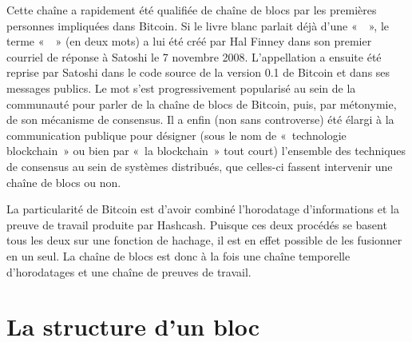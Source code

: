 Cette chaîne a rapidement été qualifiée de chaîne de blocs par les premières personnes impliquées dans Bitcoin. Si le livre blanc parlait déjà d'une «~~», le terme «~~» (en deux mots) a lui été créé par Hal Finney dans son premier courriel de réponse à Satoshi le 7 novembre 2008. L'appellation a ensuite été reprise par Satoshi dans le code source de la version 0.1 de Bitcoin et dans ses messages publics. Le mot  s'est progressivement popularisé au sein de la communauté pour parler de la chaîne de blocs de Bitcoin, puis, par métonymie, de son mécanisme de consensus. Il a enfin (non sans controverse) été élargi à la communication publique pour désigner (sous le nom de «~technologie blockchain~» ou bien par «~la blockchain~» tout court) l'ensemble des techniques de consensus au sein de systèmes distribués, que celles-ci fassent intervenir une chaîne de blocs ou non.

La particularité de Bitcoin est d'avoir combiné l'horodatage d'informations et la preuve de travail produite par Hashcash. Puisque ces deux procédés se basent tous les deux sur une fonction de hachage, il est en effet possible de les fusionner en un seul. La chaîne de blocs est donc à la fois une chaîne temporelle d'horodatages et une chaîne de preuves de travail.

\section*{La structure d'un bloc} %


